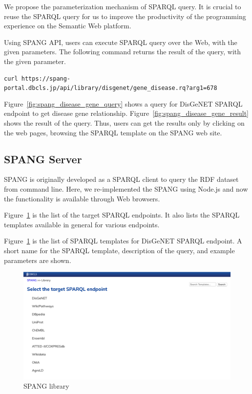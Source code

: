 \documentclass[runningheads]{llncs}
\begin{document}
We propose the parameterization mechanism of SPARQL query. It is crucial to reuse the SPARQL query for us to improve the productivity of the programming experience on the Semantic Web platform.

Using SPANG API, users can execute SPARQL query over the Web, with the given parameters.
The following command returns the result of the query, with the given parameter.

\texttt{curl https://spang-portal.dbcls.jp/api/library/disgenet/gene\_disease.rq?arg1=678}


Figure~\ref{fig:spang_disease_gene_query} shows a query for DisGeNET SPARQL endpoint to get disease gene relationship. 
Figure~\ref{fig:spang_disease_gene_result} shows the result of the query. Thus, users can get the results only by clicking on the web pages, browsing the SPARQL template on the SPANG web site.




\subsection{SPANG Server}
SPANG is originally developed as a SPARQL client to query the RDF dataset from command line. Here, we re-implemented the SPANG using Node.js and now the functionality is available through Web browsers. 


Figure~\ref{fig:spang_lib} is the list of the target SPARQL endpoints. It also lists the SPARQL templates available in general for various endpoints.

Figure~\ref{fig:spang_lib} is the list of SPARQL templates for DisGeNET SPARQL endpoint.
A short name for the SPARQL template, description of the query, and example parameters are shown.


\begin{figure}
\center
\includegraphics[width=1.0\textwidth]{spang_lib.png}
\caption{SPANG library}
\label{fig:spang_lib}
\end{figure}
\end{document}
